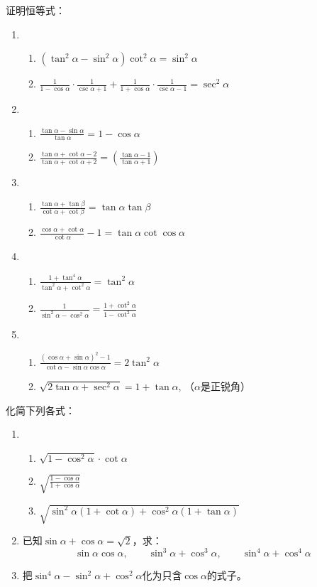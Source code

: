 \begin{ex}    
    证明恒等式：
\begin{enumerate}
    \item \begin{enumerate}
        \item $(\tan^2\alpha-\sin^2\alpha)\cot^2\alpha=\sin^2\alpha$
        \item $\frac{1}{1-\cos\alpha}\cdot\frac{1}{\csc\alpha+1}+\frac{1}{1+\cos\alpha}\cdot \frac{1}{\csc\alpha-1}=\sec^2\alpha$
    \end{enumerate}
\item \begin{enumerate}
    \item $\frac{\tan\alpha-\sin\alpha}{\tan \alpha}=1-\cos\alpha$
    \item $\frac{\tan\alpha+\cot\alpha-2}{\tan\alpha+\cot\alpha+2}=\left(\frac{\tan \alpha-1}{\tan\alpha+1}\right)$
\end{enumerate}
\item \begin{enumerate}
    \item $\frac{\tan\alpha+\tan\beta}{\cot\alpha+\cot\beta}=\tan\alpha\tan\beta$
    \item $\frac{\cos\alpha+\cot\alpha}{\cot\alpha}-1=\tan\alpha\cot \cos\alpha$
\end{enumerate}

\item\begin{enumerate}
    \item  $\frac{1+\tan^4\alpha}{\tan^2\alpha+\cot^2\alpha}=\tan^2\alpha$
    \item $\frac{1}{\sin^2\alpha-\cos^2\alpha}=\frac{1+\cot^2\alpha}{1-\cot^2\alpha}$
\end{enumerate}
\item \begin{enumerate}
\item $\frac{(\cos\alpha+\sin\alpha)^2-1}{\cot\alpha-\sin\alpha\cos\alpha}=2\tan^2 \alpha$
    \item $\sqrt{2\tan\alpha+\sec^2\alpha}=1+\tan\alpha$,  （$\alpha$是正锐角）   
\end{enumerate}
\end{enumerate}
       
   化简下列各式：
\begin{enumerate}
    \item \begin{enumerate}
        \item $\sqrt{1-\cos^2\alpha}\cdot \cot \alpha$
        \item $\sqrt{\frac{1-\cos\alpha}{1+\cos\alpha}}$
        \item $\sqrt{\sin^2\alpha(1+\cot\alpha)+\cos^2\alpha(1+\tan\alpha)}$
    \end{enumerate}
\item 已知$\sin\alpha+\cos\alpha=\sqrt{2}$，求：
\[\sin\alpha\cos\alpha,\qquad \sin^3\alpha+\cos^3\alpha,\qquad \sin^4\alpha+\cos^4\alpha\]
\item 把$\sin^4\alpha-\sin^2\alpha+\cos^2\alpha$化为只含$\cos\alpha$的式子。
\end{enumerate}
\end{ex}

